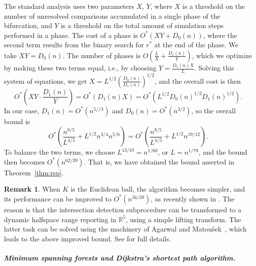 \documentclass[11pt]{article}
\newif\ifsocgproc
\def\reals{{\mathbb R}}
\def\K{\mathcal{K}}
\newtheorem{theorem}{Theorem}[section]
\theoremstyle{definition}
\newtheorem{remark}{Remark}
\begin{document}
The standard analysis uses two parameters $X$, $Y$, where $X$ is a threshold on the 
number of unresolved comparisons accumulated in a single phase of the bifurcation, 
and $Y$ is a threshold
on the total amount of simulation steps performed in a phase. The cost of a phase is
$O^*(XY + D_0(n))$, where the second term results from the binary search for $r^*$ at the 
end of the phase. We take $XY = D_0(n)$. The number of phases is 
${\displaystyle O\left( \frac{L}{X} + \frac{D_1(n)}{Y} \right)}$, which we optimize by making 
these two terms equal, i.e., by choosing ${\displaystyle Y = \frac{D_1(n)X}{L}}$. Solving this 
system of equations, we get ${\displaystyle X = L^{1/2}\left( \frac{D_0(n)}{D_1(n)}\right)^{1/2}}$, 
and the overall cost is then
\[
O^*\left( XY\cdot \frac{D_1(n)}{Y} \right) = O^*(D_1(n)X) = O^*(L^{1/2}D_0(n)^{1/2}D_1(n)^{1/2}) .
\]
In our case, $D_1(n) = O^*(n^{5//3})$ and $D_0(n) = O^*(n^{3/2})$, so the overall bound is
\[
O^*\left( \frac{n^{8/5}}{L^{4/5}} + L^{1/2}n^{3/4}n^{5/6} \right) =
O^*\left( \frac{n^{8/5}}{L^{4/5}} + L^{1/2}n^{19/12} \right) .
\]
To balance the two terms, we choose $L^{13/10} = n^{1/60}$, or $L = n^{1/78}$, and the bound then becomes
$O^*\left(n^{62/39} \right)$. That is, we have obtained the bound asserted in Theorem~\ref{thm:rsp}.
%
\medskip
\begin{remark}
When $K$ is the Euclidean ball, the algorithm becomes simpler, and its performance can be
improved to $O^*(n^{56/39})$, as recently shown in \cite{KSS}. The reason is that the intersection
detection subprocedure can be transformed to a dynamic halfspace range reporting in $\reals^5$,
using a simple lifting transform. The latter task can be solved using the machinery of Agarwal and
Matou\v{s}ek~\cite{AM95}, which leads to the above improved bound. See \cite{KSS} for full details.
\end{remark}
%
\ifsocgproc
\subparagraph*{Minimum spanning forests and Dijkstra's shortest path algorithm.}
\else
\end{document}
